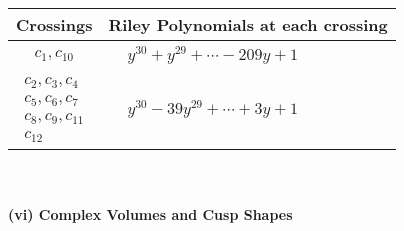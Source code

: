 \documentclass[1p]{elsarticle_modified}
\theoremstyle{definition}
\begin{document}
\begin{tabular}{m{50pt}|m{274pt}}
Crossings & \hspace{64pt}Riley Polynomials at each crossing \\
\hline $$\begin{aligned}c_{1},c_{10}\end{aligned}$$&$\begin{aligned}
&y^{30}+y^{29}+\cdots-209 y+1
\end{aligned}$\\
\hline $$\begin{aligned}c_{2},c_{3},c_{4}\\c_{5},c_{6},c_{7}\\c_{8},c_{9},c_{11}\\c_{12}\end{aligned}$$&$\begin{aligned}
&y^{30}-39 y^{29}+\cdots+3 y+1
\end{aligned}$\\
\hline
\end{tabular}\\~\\
\newpage\flushleft \textbf{(vi) Complex Volumes and Cusp Shapes}
\end{document}
